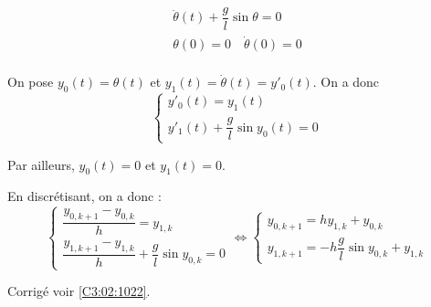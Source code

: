 \normaltrue \difficilefalse \tdifficilefalse
\correctionfalse


\setcounter{question}{0}
\ifcorrection
\else
{}
\fi



$$
\begin{array}{l}
\ddot{\theta}(t) + \dfrac{g}{l}\sin \theta = 0\\
\theta(0) = 0 \quad \dot{\theta}(0) = 0 \\
\end{array} 
$$


\ifprof
On pose $y_0(t) = \theta(t) $ et $y_1(t) = \dot{\theta}(t) = y'_0(t) $. On a donc 
$$
\left\{
\begin{array}{l}
y'_0(t) = y_1(t) \\
y'_1(t) + \dfrac{g}{l} \sin y_0(t) = 0
\end{array} 
\right.
$$

Par ailleurs, $y_0(t) = 0 $ et $y_1(t) =0$.

En discrétisant, on a donc :
$$
\left\{
\begin{array}{l}
\dfrac{y_{0,k+1}-y_{0,k}}{h} = y_{1,k} \\
\dfrac{y_{1,k+1}-y_{1,k}}{h} + \dfrac{g}{l} \sin y_{0,k} = 0
\end{array} 
\right.
\Longleftrightarrow
\left\{
\begin{array}{l}
y_{0,k+1} = h y_{1,k} + y_{0,k}\\
y_{1,k+1} = - h \dfrac{g}{l} \sin y_{0,k}  + y_{1,k}
\end{array} 
\right.
$$
\else
\fi



 

\ifprof
\else
\begin{flushright}
\footnotesize{Corrigé  voir \ref{C3:02:1022}.}
\end{flushright}%
\fi